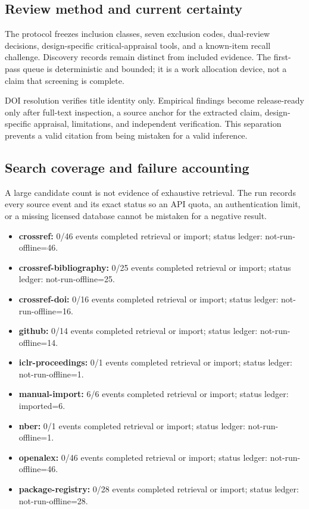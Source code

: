 \documentclass[11pt]{article}
\providecommand{\tightlist}{\setlength{\itemsep}{0pt}\setlength{\parskip}{0pt}}
\begin{document}
\hypertarget{review-method-and-current-certainty}{%
\subsection{Review method and current certainty}\label{review-method-and-current-certainty}}

The protocol freezes inclusion classes, seven exclusion codes, dual-review decisions, design-specific critical-appraisal tools, and a known-item recall challenge. Discovery records remain distinct from included evidence. The first-pass queue is deterministic and bounded; it is a work allocation device, not a claim that screening is complete.

DOI resolution verifies title identity only. Empirical findings become release-ready only after full-text inspection, a source anchor for the extracted claim, design-specific appraisal, limitations, and independent verification. This separation prevents a valid citation from being mistaken for a valid inference.

\hypertarget{search-coverage-and-failure-accounting}{%
\subsection{Search coverage and failure accounting}\label{search-coverage-and-failure-accounting}}

A large candidate count is not evidence of exhaustive retrieval. The run records every source event and its exact status so an API quota, an authentication limit, or a missing licensed database cannot be mistaken for a negative result.

\begin{itemize}
\tightlist
\item
  \textbf{crossref:} 0/46 events completed retrieval or import; status ledger: not-run-offline=46.
\item
  \textbf{crossref-bibliography:} 0/25 events completed retrieval or import; status ledger: not-run-offline=25.
\item
  \textbf{crossref-doi:} 0/16 events completed retrieval or import; status ledger: not-run-offline=16.
\item
  \textbf{github:} 0/14 events completed retrieval or import; status ledger: not-run-offline=14.
\item
  \textbf{iclr-proceedings:} 0/1 events completed retrieval or import; status ledger: not-run-offline=1.
\item
  \textbf{manual-import:} 6/6 events completed retrieval or import; status ledger: imported=6.
\item
  \textbf{nber:} 0/1 events completed retrieval or import; status ledger: not-run-offline=1.
\item
  \textbf{openalex:} 0/46 events completed retrieval or import; status ledger: not-run-offline=46.
\item
  \textbf{package-registry:} 0/28 events completed retrieval or import; status ledger: not-run-offline=28.
\end{itemize}
\end{document}
